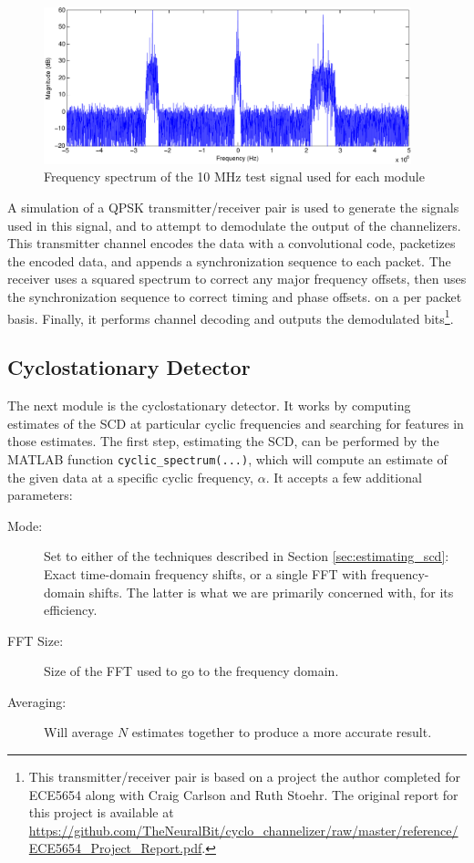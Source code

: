\documentclass[12pt]{article}
\begin{document}
\begin{figure}[h]
    \begin{center}
        \includegraphics[width=0.95\textwidth]{test_signal}
    \end{center}
    \caption{Frequency spectrum of the 10 MHz test signal used for each module}
    \label{fig:test_signal}
\end{figure}

A simulation of a QPSK transmitter/receiver pair is used to generate the
signals used in this signal, and to attempt to demodulate the output of the
channelizers. This transmitter channel encodes the data with a convolutional
code, packetizes the encoded data, and appends a synchronization sequence to
each packet. The receiver uses a squared spectrum to correct any major
frequency offsets, then uses the synchronization sequence to correct timing and
phase offsets. on a per packet basis. Finally, it performs channel decoding and
outputs the demodulated bits\footnote{This transmitter/receiver pair is based
on a project the author completed for ECE5654 along with Craig Carlson and Ruth Stoehr.
The original report for this project is available at
\url{https://github.com/TheNeuralBit/cyclo_channelizer/raw/master/reference/ECE5654_Project_Report.pdf}.}.

\subsection{Cyclostationary Detector}
\label{sec:sim_cyclo}
The next module is the cyclostationary detector. It works by computing
estimates of the SCD at particular cyclic frequencies and searching for
features in those estimates. The first step, estimating the SCD, can be
performed by the MATLAB function \texttt{cyclic\_spectrum(...)}, which will
compute an estimate of the given data at a specific cyclic frequency, $\alpha$.
It accepts a few additional parameters:

\begin{description}
    \item[Mode:] Set to either of the techniques described in Section
    \ref{sec:estimating_scd}: Exact time-domain frequency shifts, or a single
    FFT with frequency-domain shifts. The latter is what we are primarily concerned
    with, for its efficiency.
    \item[FFT Size:] Size of the FFT used to go to the frequency domain.
    \item[Averaging:] Will average $N$ estimates together to produce a more
        accurate
    result.
\end{description}
\end{document}
